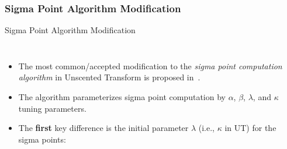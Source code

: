 \subsubsection{Sigma Point Algorithm Modification}
\begin{frame}{Sigma Point Algorithm Modification}
\begin{columns}
        \begin{itemize}
            \item The most common/accepted modification to the \textit{sigma point computation algorithm} in Unscented Transform is proposed in~\cite{Wan_SigmaPointModification_2000}.
            \item The algorithm parameterizes sigma point computation by $\alpha$, $\beta$, $\lambda$, and $\kappa$ tuning parameters. 
            \item The \textbf{first} key difference is the initial parameter $\lambda$ (i.e., $\kappa$ in UT) for the sigma points:
        

\end{itemize}
\end{columns}
\end{frame}
